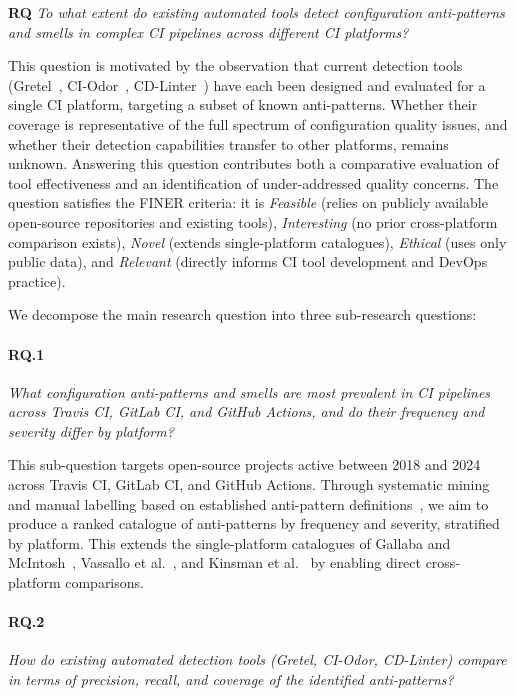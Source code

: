 \documentclass[12pt, a4paper]{article}
\begin{document}
\bigskip
\noindent\textbf{RQ\quad} \textit{To what extent do existing automated tools detect
configuration anti-patterns and smells in complex CI pipelines across different CI
platforms?}
\bigskip

This question is motivated by the observation that current detection tools
(Gretel~\cite{gallaba2020}, CI-Odor~\cite{vassallo2019}, CD-Linter~\cite{vassallo2020b})
have each been designed and evaluated for a single CI platform, targeting a subset
of known anti-patterns. Whether their coverage is representative of the full spectrum
of configuration quality issues, and whether their detection capabilities transfer to
other platforms, remains unknown. Answering this question contributes both a
comparative evaluation of tool effectiveness and an identification of under-addressed
quality concerns. The question satisfies the FINER criteria: it is \emph{Feasible}
(relies on publicly available open-source repositories and existing tools),
\emph{Interesting} (no prior cross-platform comparison exists), \emph{Novel} (extends
single-platform catalogues), \emph{Ethical} (uses only public data), and
\emph{Relevant} (directly informs CI tool development and DevOps practice).

We decompose the main research question into three sub-research questions:

\paragraph{RQ.1}
\textit{What configuration anti-patterns and smells are most prevalent in CI pipelines
across Travis CI, GitLab CI, and GitHub Actions, and do their frequency and severity
differ by platform?}

This sub-question targets open-source projects active between 2018 and 2024 across
Travis CI, GitLab CI, and GitHub Actions. Through systematic mining and manual
labelling based on established anti-pattern definitions~\cite{gallaba2020, vassallo2020b, zampetti2020},
we aim to produce a ranked catalogue of anti-patterns by frequency and severity,
stratified by platform. This extends the single-platform catalogues of Gallaba and
McIntosh~\cite{gallaba2020}, Vassallo et al.~\cite{vassallo2020b}, and Kinsman et
al.~\cite{kinsman2021} by enabling direct cross-platform comparisons.

\paragraph{RQ.2}
\textit{How do existing automated detection tools (Gretel, CI-Odor, CD-Linter)
compare in terms of precision, recall, and coverage of the identified anti-patterns?}
\end{document}
